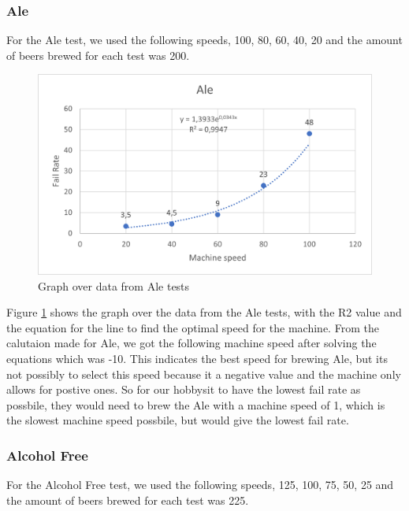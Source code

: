 \subsubsection{Ale}
For the Ale test, we used the following speeds, 100, 80, 60, 40, 20 and the amount of beers brewed for each test was 200.

\begin{center}
    \centering
    \begin{figure}[H]
        \includegraphics[width=1\textwidth]{img/Ale_graph.png}
        \caption{Graph over data from Ale tests}
        \label{fig:Ale_graph}
    \end{figure}
\end{center}

Figure \ref{fig:Ale_graph} shows the graph over the data from the Ale tests, with the R2 value and the equation for the line to find the optimal speed for the machine. \newline
From the calutaion made for Ale, we got the following machine speed after solving the equations which was -10. This indicates the best speed for brewing Ale, but its not possibly to select this speed because it a negative value and the machine only allows for postive ones. 
So for our hobbysit to have the lowest fail rate as possbile, they would need to brew the Ale with a machine speed of 1, which is the slowest machine speed possbile, but would give the lowest fail rate. \newline


\subsubsection{Alcohol Free}
For the Alcohol Free test, we used the following speeds, 125, 100, 75, 50, 25 and the amount of beers brewed for each test was 225.

